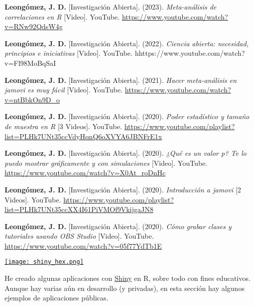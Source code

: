 \documentclass[11pt,a4paper,]{awesome-cv}
\begin{document}
\begingroup
\footnotesize
\setlength{\parindent}{-0.5in}
\setlength{\leftskip}{0.5in}

\textbf{Leongómez, J. D.} {[}Investigación Abierta{]}. (2023).
\emph{Meta-análisis de correlaciones en R} {[}Video{]}. YouTube.
\url{https://www.youtube.com/watch?v=RNw92QdsW4g}

\textbf{Leongómez, J. D.} {[}Investigación Abierta{]}. (2022).
\emph{Ciencia abierta: necesidad, principios e iniciativas} {[}Video{]}.
YouTube. hhttps://www.youtube.com/watch?v=Fl98MoBqSaI

\textbf{Leongómez, J. D.} {[}Investigación Abierta{]}. (2021).
\emph{Hacer meta-análisis en jamovi es muy fácil} {[}Video{]}. YouTube.
\url{https://www.youtube.com/watch?v=ntBbkOn9D_o}

\textbf{Leongómez, J. D.} {[}Investigación Abierta{]}. (2020).
\emph{Poder estadístico y tamaño de muestra en R} {[}3 Videos{]}.
YouTube.
\url{https://www.youtube.com/playlist?list=PLHk7UNt35ccVdyHqnQ6oXVYA6JBNFrE1x}

\textbf{Leongómez, J. D.} {[}Investigación Abierta{]}. (2020).
\emph{¿Qué es un valor p? Te lo puedo mostrar gráficamente y con
simulaciones} {[}Video{]}. YouTube.
\url{https://www.youtube.com/watch?v=X0At_roDnHc}

\textbf{Leongómez, J. D.} {[}Investigación Abierta{]}. (2020).
\emph{Introducción a jamovi} {[}2 Videos{]}. YouTube.
\url{https://www.youtube.com/playlist?list=PLHk7UNt35ccXX4I61PiVMOf9VkijgaJN8}

\textbf{Leongómez, J. D.} {[}Investigación Abierta{]}. (2020).
\emph{Cómo grabar clases y tutoriales usando OBS Studio} {[}Video{]}.
YouTube. \url{https://www.youtube.com/watch?v=05f77YdTb1E}

\endgroup

\begin{minipage}[c]{0.10\linewidth}
\href{https://jdleongomez.info/es/#shiny}{\texttt{[image: shiny\_hex.png]}}
\end{minipage} \begin{minipage}[c]{0.90\linewidth} \begin{footnotesize}
He creado algunas aplicaciones con \href{https://shiny.posit.co/}{Shiny} en R, sobre todo con fines educativos. Aunque hay varias aún en desarrollo (y privadas), en esta sección hay algunos ejemplos de aplicaciones públicas.
\end{footnotesize}
\end{minipage}

\begingroup
\footnotesize
\setlength{\parindent}{-0.5in}
\setlength{\leftskip}{0.5in}
\end{document}
